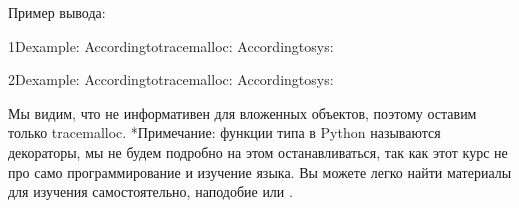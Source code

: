 \documentclass[letterpaper,10pt,russian]{sphinxmanual}
\begin{document}
\begin{sphinxVerbatim}[commandchars=\\\{\}]
 

   
\end{sphinxVerbatim}

\sphinxAtStartPar
Пример вывода:

\begin{sphinxVerbatim}[commandchars=\\\{\}]
1Dexample:
Accordingtotracemalloc:
Accordingtosys:

2Dexample:
Accordingtotracemalloc:
Accordingtosys:
\end{sphinxVerbatim}

\sphinxAtStartPar
Мы видим, что  не информативен для вложенных объектов, поэтому оставим только tracemalloc. *Примечание: функции типа  в Python называются декораторы, мы не будем подробно на этом останавливаться, так как этот курс не про само программирование и изучение языка. Вы можете легко найти материалы для изучения самостоятельно, наподобие  или .
\end{document}
